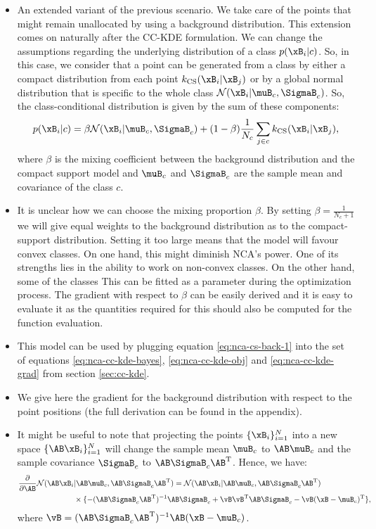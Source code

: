 \begin{itemize}
	\item An extended variant of the previous scenario. We take care of the points
that might remain unallocated by using a background distribution. This extension
comes on naturally after the CC-KDE formulation. We can change the assumptions
regarding the underlying distribution of a class $p(\xB_i|c)$. So, in this case,
we consider that a point can be generated from a class by either a compact
distribution from each point $k_\text{CS}(\xB_i|\xB_j)$ or by a global normal
distribution that is specific to the whole class
$\mathcal{N}(\xB_i|\muB_c,\SigmaB_c)$. So, the class-conditional distribution is
given by the sum of these components:
	\begin{align}
		p(\xB_i|c) = \beta \mathcal{N}(\xB_i|\muB_c,\SigmaB_c) + (1-\beta)
\frac{1}{N_c}\sum_{j\in c} k_\text{CS}(\xB_i|\xB_j),
		\label{eq:nca-cs-back-1}
	\end{align}
	where $\beta$ is the mixing coefficient between the background distribution and
the compact support model and $\muB_c$ and $\SigmaB_c$ are the sample mean and
covariance of the class $c$.
	\item It is unclear how we can choose the mixing proportion $\beta$. By setting
$\beta = \frac{1}{N_c+1}$ we will give equal weights to the background
distribution as to the compact-support distribution. Setting it too large means
that the model will favour convex classes. On one hand, this might diminish
NCA's power. One of its strengths lies in the ability to work on non-convex
classes. On the other hand, some of the classes  This can be fitted as a
parameter during the optimization process. The gradient with respect to $\beta$
can be easily derived and it is easy to evaluate it as the quantities required
for this should also be computed for the function evaluation. 
	\item This model can be used by plugging equation \ref{eq:nca-cs-back-1} into
the set of equations \ref{eq:nca-cc-kde-bayes}, \ref{eq:nca-cc-kde-obj} and
\ref{eq:nca-cc-kde-grad} from section \ref{sec:cc-kde}. 
	\item We give here the gradient for the background distribution with respect to
the point positions (the full derivation can be found in the appendix). 
	\item It might be useful to note that projecting the points $\{\xB_i\}_{i=1}^N$
into a new space $\{\AB\xB_i\}_{i=1}^N$ will change the sample mean $\muB_c$ to
$\AB\muB_c$ and the sample covariance $\SigmaB_c$ to
$\AB\SigmaB_c\AB^\mathrm{T}$. Hence, we have:
	\begin{align}
		\frac{\partial}{\partial \AB} \mathcal{N}(\AB\xB_i&|\AB\muB_c, \AB\SigmaB_c
\AB^\mathrm{T}) = \mathcal{N}(\AB\xB_i|\AB\muB_c, \AB\SigmaB_c
\AB^\mathrm{T})\notag\\
		&\times \{ -(\AB\SigmaB_c \AB^\mathrm{T})^{-1}\AB\SigmaB_c
		+\vB \vB ^ \mathrm{T} \AB \SigmaB_c - \vB (\xB - \muB_c)^\mathrm{T}
		\},
	\end{align}
	where $\vB = (\AB\SigmaB_c \AB^\mathrm{T})^{-1}\AB(\xB - \muB_c)$.
\end{itemize}

